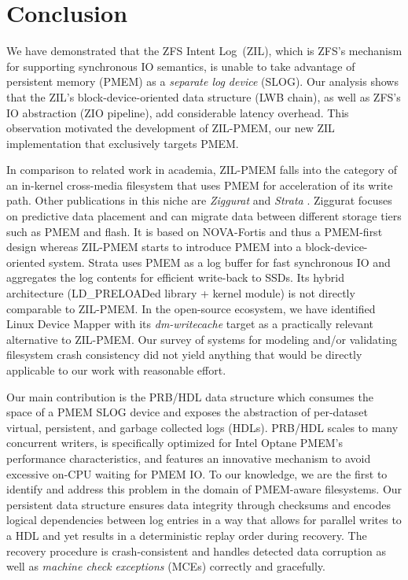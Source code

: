 \documentclass[12pt,a4paper,twoside]{book}
\begin{document}
\chapter{Conclusion}\label{ch:conclusion}

We have demonstrated that the ZFS Intent Log~(ZIL), which is ZFS's mechanism for supporting synchronous IO semantics, is unable to take advantage of persistent memory (PMEM) as a \textit{separate log device} (SLOG).
Our analysis shows that the ZIL's block-device-oriented data structure (LWB chain), as well as ZFS's IO abstraction (ZIO pipeline), add considerable latency overhead.
This observation motivated the development of ZIL-PMEM, our new ZIL implementation that exclusively targets PMEM.

In comparison to related work in academia, ZIL-PMEM falls into the category of an in-kernel cross-media filesystem that uses PMEM for acceleration of its write path.
Other publications in this niche are \textit{Ziggurat} and \textit{Strata} \cite{zhengZigguratTieredFile2019,kwonStrataCrossMedia2017}.
Ziggurat focuses on predictive data placement and can migrate data between different storage tiers such as PMEM and flash.
It is based on NOVA-Fortis and thus a PMEM-first design whereas ZIL-PMEM starts to introduce PMEM into a block-device-oriented system.
Strata uses PMEM as a log buffer for fast synchronous IO and aggregates the log contents for efficient write-back to SSDs.
Its hybrid architecture (LD\_PRELOADed library + kernel module) is not directly comparable to ZIL-PMEM.
In the open-source ecosystem, we have identified Linux Device Mapper with its \textit{dm-writecache} target as a practically relevant alternative to \mbox{ZIL-PMEM}.
Our survey of systems for modeling and/or validating filesystem crash consistency did not yield anything that would be directly applicable to our work with reasonable effort.

Our main contribution is the PRB/HDL data structure which consumes the space of a PMEM SLOG device and exposes the abstraction of per-dataset virtual, persistent, and garbage collected logs (HDLs).
PRB/HDL scales to many concurrent writers, is specifically optimized for Intel Optane PMEM's performance characteristics, and features an innovative mechanism to avoid excessive on-CPU waiting for PMEM IO.
To our knowledge, we are the first to identify and address this problem in the domain of PMEM-aware filesystems.
Our persistent data structure ensures data integrity through checksums and encodes logical dependencies between log entries in a way that allows for parallel writes to a HDL and yet results in a deterministic replay order during recovery.
The recovery procedure is crash-consistent and handles detected data corruption as well as \textit{machine check exceptions} (MCEs) correctly and gracefully.
\end{document}
